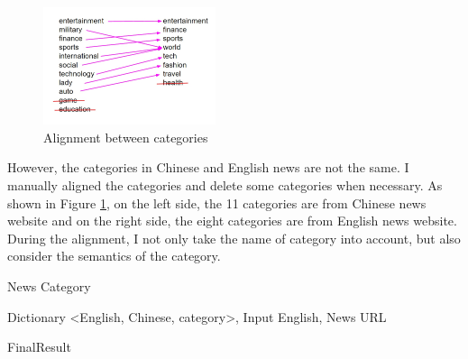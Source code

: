 \begin{CJK}{UTF8}{gbsn}
\begin{figure}[ht]
    \centering
    \includegraphics[width=0.45\textwidth]{wsd_4.jpg}
    \caption{Alignment between categories}
    \label{fig:wsd_4}
\end{figure}

However, the categories in Chinese and English news are not the same.
I manually aligned the categories and delete some categories when necessary.
As shown in Figure \ref{fig:wsd_4}, 
on the left side, the 11 categories are from Chinese news website and on the right side, the eight categories are from English news website. 
During the alignment, I not only take the name of category into account, but also consider the semantics of the category.
\\
\begin{algorithm}[ht]
\caption{News Category}
\label{algorithm:wsd_2}
\begin{algorithmic}
\REQUIRE Dictionary \textless English, Chinese, category\textgreater, Input English, News URL

        \ENDIF
    \ENDFOR
\ENDIF
\RETURN FinalResult


\end{algorithmic}
\end{algorithm}
\end{CJK}

